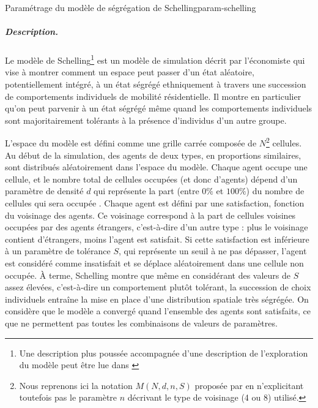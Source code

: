 \begin{encadre}{Paramétrage du modèle de ségrégation de Schelling}{param-schelling}
\renewcommand{\thempfootnote}{\alph{mpfootnote}}

\subparagraph{Description.}
Le modèle de Schelling\footnote{
	Une description plus poussée accompagnée d'une description de l'exploration du modèle peut être lue dans \autocite{daude_comparaison_2006}
} est un modèle de simulation décrit par l'économiste \textcite{schelling_dynamic_1971} qui vise à montrer comment un espace peut passer d'un état aléatoire, potentiellement intégré, à un état ségrégé ethniquement à travers une succession de comportements individuels de mobilité résidentielle.
Il montre en particulier qu'on peut parvenir à un état ségrégé même quand les comportements individuels sont majoritairement tolérants à la présence d'individus d'un autre groupe.

L'espace du modèle est défini comme une grille carrée composée de $N$\footnote{
	Nous reprenons ici la notation $M(N, d, n, S)$ proposée par \textcite[433]{daude_comparaison_2006} en n'explicitant toutefois pas le paramètre $n$ décrivant le type de voisinage (4 ou 8) utilisé.
} cellules.
Au début de la simulation, des agents de deux types, en proportions similaires, sont distribués aléatoirement dans l'espace du modèle.
Chaque agent occupe une cellule, et le nombre total de cellules occupées (et donc d'agents) dépend d'un paramètre de densité $d$ qui représente la part (entre $0\%$ et $100\%$) du nombre de cellules qui sera occupée
.
Chaque agent est défini par une satisfaction, fonction du voisinage des agents.
Ce voisinage correspond à la part de cellules voisines occupées par des agents \og étrangers\fg{}, c'est-à-dire d'un autre type : plus le voisinage contient d'étrangers, moins l'agent est satisfait.
Si cette satisfaction est inférieure à un paramètre de tolérance $S$, qui représente un seuil à ne pas dépasser, l'agent est considéré comme insatisfait et se déplace aléatoirement dans une cellule non occupée.
À terme, Schelling montre que même en considérant des valeurs de $S$ assez élevées, c'est-à-dire un comportement plutôt tolérant, la succession de choix individuels entraîne la mise en place d'une distribution spatiale très ségrégée.
On considère que le modèle a convergé quand l'ensemble des agents sont satisfaits, ce que ne permettent pas toutes les combinaisons de valeurs de paramètres.


\end{encadre}

